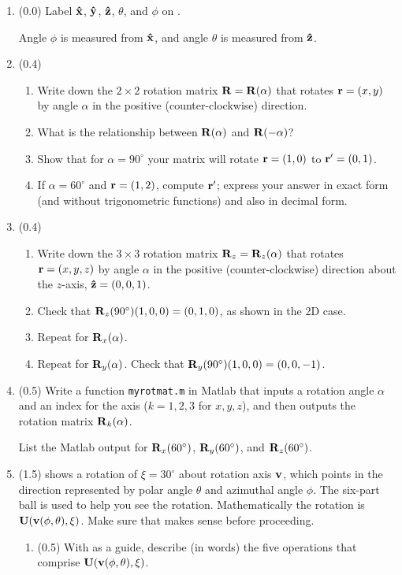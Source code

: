 \documentclass[11pt,titlepage,fleqn]{article}
\newcommand{\rotangA}{\alpha}
\newcommand{\rotangB}{\xi}    %
\newcommand{\rotvec}{\bv}      %
\begin{document}
\begin{enumerate}

\item (0.0) Label $\mbox{\boldmath{$\hat{\rm x}$}}$, $\mbox{\boldmath{$\hat{\rm y}$}}$, $\mbox{\boldmath{$\hat{\rm z}$}}$, $\theta$, and $\phi$ on .

Angle $\phi$ is measured from $\mbox{\boldmath{$\hat{\rm x}$}}$, and angle $\theta$ is measured from $\mbox{\boldmath{$\hat{\rm z}$}}$.

\item (0.4) 

\begin{enumerate}
\item Write down the $2 \times 2$ rotation matrix $\bR = \bR(\rotangA)$ that rotates $\mbox{${\bf r}$} = (x,y)$ by angle $\rotangA$ in the positive (counter-clockwise) direction.
\item What is the relationship between $\bR(\rotangA)$ and $\bR(-\rotangA)$?
\item Show that for $\rotangA = 90^\circ$ your matrix will rotate $\mbox{${\bf r}$} = (1,0)$ to $\mbox{${\bf r}$}' = (0,1)$.
\item If $\rotangA = 60^\circ$ and $\mbox{${\bf r}$} = (1,2)$, compute $\mbox{${\bf r}$}'$; express your answer in exact form (and without trigonometric functions) and also in decimal form.
\end{enumerate}

\item (0.4)

\begin{enumerate}
\item Write down the $3 \times 3$ rotation matrix $\bR_z = \bR_z(\rotangA)$ that rotates $\mbox{${\bf r}$} = (x,y,z)$ by angle $\rotangA$ in the positive (counter-clockwise) direction about the $z$-axis, $\mbox{\boldmath{$\hat{\rm z}$}} = (0,0,1)$.
\item Check that $\mbox{${\bf R}$}_z(90^\circ)(1,0,0) = (0,1,0)$, as shown in the 2D case.
\item Repeat for $\bR_x(\rotangA)$.
\item Repeat for $\bR_y(\rotangA)$. Check that $\mbox{${\bf R}$}_y(90^\circ)(1,0,0) = (0,0,-1)$.
\end{enumerate}

\item (0.5) Write a function \verb+myrotmat.m+ in Matlab that inputs a rotation angle $\rotangA$ and an index for the axis ($k = 1,2,3$ for $x,y,z$), and then outputs the rotation matrix $\bR_k(\rotangA)$. 

List the Matlab output for $\mbox{${\bf R}$}_x(60^\circ)$, $\mbox{${\bf R}$}_y(60^\circ)$, and $\mbox{${\bf R}$}_z(60^\circ)$.

\item (1.5)  shows a rotation of $\rotangB = 30^\circ$ about rotation axis $\rotvec$, which points in the direction represented by polar angle $\theta$ and azimuthal angle $\phi$. The six-part ball is used to help you see the rotation. Mathematically the rotation is $\bU(\rotvec(\phi,\theta),\rotangB)$. Make sure that  makes sense before proceeding.
%
\begin{enumerate}
\item (0.5) With  as a guide, describe (in words) the five operations that comprise $\bU(\rotvec(\phi,\theta),\rotangB)$.


\end{enumerate}
\end{enumerate}
\end{document}
